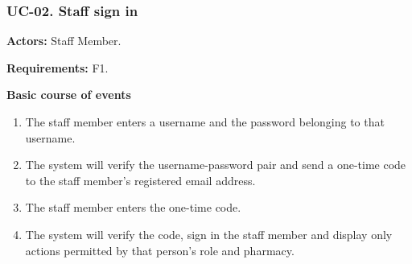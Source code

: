 \newcommand{\compactactivity}[6]{%
\medskip
\subsubsection*{#1 activity diagram}
\begin{center}
\begin{tikzpicture}[font=\footnotesize,>=stealth,
 action/.style={draw,rounded corners,align=center,text width=8cm,inner sep=5pt},
 branch/.style={draw,rounded corners,align=center,text width=4.2cm,inner sep=5pt}]
\fill (0,0) circle (3pt);
\node[action] (actor) at (0,-1) {#2};
\node[action] (system) at (0,-2.5) {#3};
\draw[->] (0,0) -- (actor);
\draw[->] (actor) -- (system);
\draw (0,-4) ++(0,.32) -- ++(.46,-.32) -- ++(-.46,-.32) -- ++(-.46,.32) -- cycle;
\node[anchor=east,align=right,text width=5.8cm] at (-.52,-4) {#4};
\node[branch] (no) at (4.6,-4) {#6};
\node[action] (yes) at (0,-5.7) {#5};
\node[circle,draw,minimum size=9pt,inner sep=0pt] (noend) at (4.6,-5.25) {};
\fill (noend.center) circle (2.3pt);
\node[circle,draw,minimum size=9pt,inner sep=0pt] (yesend) at (0,-6.85) {};
\fill (yesend.center) circle (2.3pt);
\draw[->] (system) -- (0,-3.68);
\draw[->] (.46,-4) -- node[above]{no} (no);
\draw[->] (0,-4.32) -- node[left]{yes} (yes);
\draw[->] (no) -- (noend);
\draw[->] (yes) -- (yesend);
\end{tikzpicture}
\end{center}
}

\clearpage
\subsubsection*{UC-02. Staff sign in}
\textbf{Actors:} Staff Member.

\textbf{Requirements:} F1.

\textbf{Basic course of events}
\begin{enumerate}
\item The staff member enters a username and the password belonging to that username.
\item The system will verify the username-password pair and send a one-time code to the staff member's registered email address.
\item The staff member enters the one-time code.
\item The system will verify the code, sign in the staff member and display only actions permitted by that person's role and pharmacy.
\end{enumerate}


